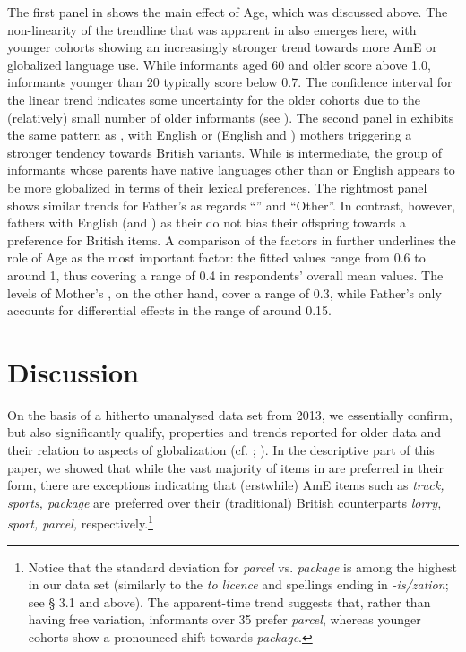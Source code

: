 \documentclass[output=paper]{langsci/langscibook}
\begin{document}
The first panel in  shows the main effect of Age, which was discussed above. The non-linearity of the trendline that was apparent in  also emerges here, with younger cohorts showing an increasingly stronger trend towards more AmE or globalized language use. While informants aged 60 and older score above 1.0, informants younger than 20 typically score below 0.7. The confidence interval for the linear trend indicates some uncertainty for the older cohorts due to the (relatively) small number of older informants (see ). The second panel in  exhibits the same pattern as , with English or  (English and ) mothers triggering a stronger tendency towards British variants. While  is intermediate, the group of informants whose parents have native languages other than  or English appears to be more globalized in terms of their lexical preferences. The rightmost panel shows similar trends for Father’s  as regards “” and “Other”. In contrast, however, fathers with English (and ) as their  do not bias their offspring towards a preference for British items. A comparison of the factors in  further underlines the role of Age as the most important factor: the fitted values range from 0.6 to around 1, thus covering a range of 0.4 in respondents’ overall mean values. The levels of Mother’s , on the other hand, cover a range of 0.3, while Father’s  only accounts for differential effects in the range of around 0.15.

\section{Discussion}

On the basis of a hitherto unanalysed data set from 2013, we essentially confirm, but also significantly qualify, properties and trends reported for older  data and their relation to aspects of globalization (cf. \citealt{KrugRosen2012}; \citealt{Krug2015}). In the descriptive part of this paper, we showed that while the vast majority of items in  are preferred in their  form, there are exceptions indicating that (erstwhile) AmE items such as \textit{truck, sports, package} are preferred over their (traditional) British counterparts \textit{lorry, sport, parcel,} respectively.\footnote{Notice that the standard deviation for \textit{parcel} vs. \textit{package} is among the highest in our data set (similarly to the  \textit{to licence} and spellings ending in \textit{-is/zation}; see § 3.1 and  above). The apparent-time trend suggests that, rather than having free variation, informants over 35 prefer \textit{parcel}, whereas younger cohorts show a pronounced shift towards \textit{package}.} 
\end{document}
